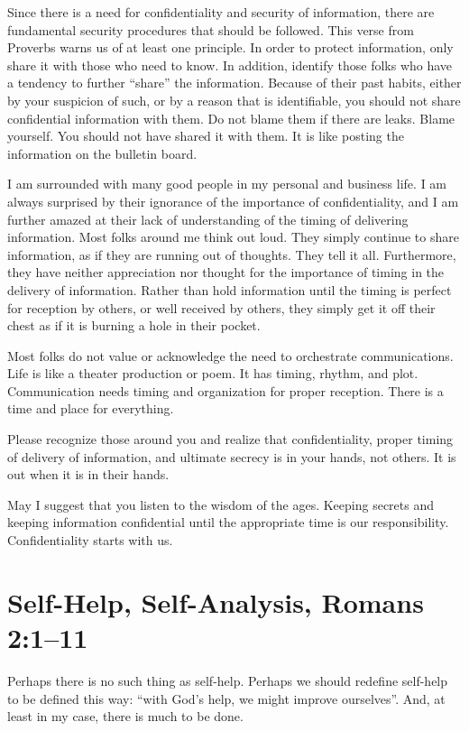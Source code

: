 \documentclass[12pt]{memoir}
\begin{document}
Since there is a need for confidentiality and security of information,
there are fundamental security procedures that should be followed.
This verse from Proverbs warns us of at least one principle. In order
to protect information, only share it with those who need to know. In addition, identify those folks who have a tendency to further ``share'' the information. Because of their past habits, either by
your suspicion of such, or by a reason that is identifiable, you should
not share confidential information with them. Do not blame them if
there are leaks. Blame yourself. You should not have shared it with them.
It is like posting the information on the bulletin board.

I am surrounded with many good people in my personal and business life.
I am always surprised by their ignorance of the importance of confidentiality,
and I am further amazed at their lack of understanding of the timing
of delivering information. Most folks around me think out loud. They simply continue to share information, as if they are running
out of thoughts. They tell it all. Furthermore, they have
neither appreciation nor thought for the importance of timing in the delivery
of information. Rather than hold information until the timing is perfect
for reception by others, or well received by others, they simply get
it off their chest as if it is burning a hole in their pocket.

Most folks do not value or acknowledge the need to orchestrate communications.
Life is like a theater production or poem. It has timing, rhythm,
and plot. Communication needs timing and organization for proper reception.
There is a time and place for everything. 

Please recognize those around you and realize that confidentiality,
proper timing of delivery of information, and ultimate secrecy is
in your hands, not others. It is out when it is in their hands.

May I suggest that you listen to the wisdom of the ages. Keeping secrets
and keeping information confidential until the appropriate time is
our responsibility. Confidentiality starts with us.

\section[Self-Help, Self-Analysis]{Self-Help, Self-Analysis, Romans 2:1--11}

Perhaps there is no such thing as self-help. Perhaps we should redefine self-help to be defined this way: ``with God's help, we might improve ourselves''.
And, at least in my case, there is much to be done.
\end{document}

